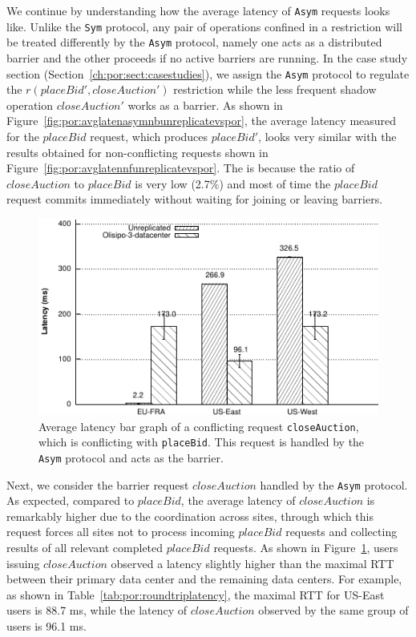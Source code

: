 We continue by understanding how the average latency of {\tt Asym} requests looks like. 
Unlike the {\tt Sym} protocol, any pair of operations confined in a restriction 
will be treated differently by the {\tt Asym} protocol, namely one acts
as a distributed barrier and the other proceeds if no active barriers are running. 
In the case study section (Section~\ref{ch:por:sect:casestudies}), we assign 
the {\tt Asym} protocol to regulate the $r(placeBid', closeAuction')$ restriction while 
the less frequent shadow operation $closeAuction'$ works as a barrier. As shown in 
Figure~\ref{fig:por:avglatenasymnbunreplicatevspor}, the average latency 
measured for the $placeBid$ request, which produces $placeBid'$, looks very similar
with the results obtained for non-conflicting requests shown in Figure~\ref{fig:por:avglatennfunreplicatevspor}.
The is because the ratio of $closeAuction$ to
$placeBid$ is very low (2.7\%) and most of time the $placeBid$ request 
commits immediately without waiting for joining or leaving barriers. 
\begin{figure}[t!]
  \centering
\includegraphics[width=0.85\columnwidth]{figures/eval/avg_latency_asym_closeauction_unreplicated_vs_por.pdf}
  \caption{Average latency bar graph of a conflicting request {\tt closeAuction},
  which is conflicting with {\tt placeBid}. This request is handled by the {\tt Asym}
  protocol and acts as the barrier.}
 \label{fig:por:avglatenasymbunreplicatevspor}
\end{figure}


Next, we consider the barrier request $closeAuction$ handled by 
the {\tt Asym} protocol. As expected, compared to $placeBid$, the average 
latency of $closeAuction$ is remarkably higher due to
the coordination across sites, through which this request forces all sites not to
process incoming $placeBid$ requests and collecting results of all relevant
completed $placeBid$ requests. As shown in 
Figure~\ref{fig:por:avglatenasymbunreplicatevspor}, users issuing
$closeAuction$ observed a latency slightly higher than the maximal RTT between 
their primary data center and the remaining data centers. For example, 
as shown in Table~\ref{tab:por:roundtriplatency}, the maximal RTT for US-East users
is 88.7 ms, while the latency of $closeAuction$ observed by 
the same group of users is 96.1 ms.

